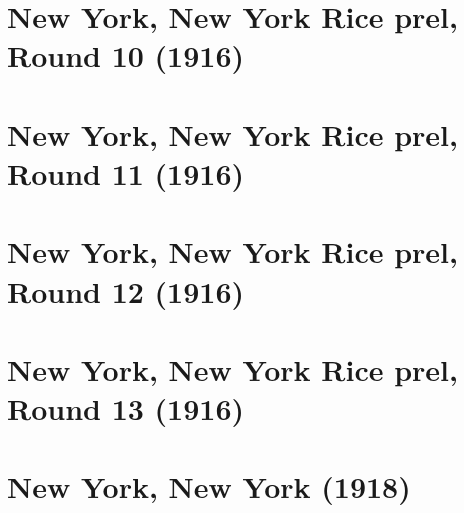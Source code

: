 \documentclass[11pt]{article}
\begin{document}
\clearpage

\section{New York, New York Rice prel, Round 10 (1916)}


\clearpage

\section{New York, New York Rice prel, Round 11 (1916)}


\clearpage

\section{New York, New York Rice prel, Round 12 (1916)}


\clearpage

\section{New York, New York Rice prel, Round 13 (1916)}


\clearpage

\section{New York, New York (1918)}


\clearpage



\clearpage



\clearpage



\clearpage



\clearpage



\clearpage



\clearpage



\clearpage



\clearpage
\end{document}
